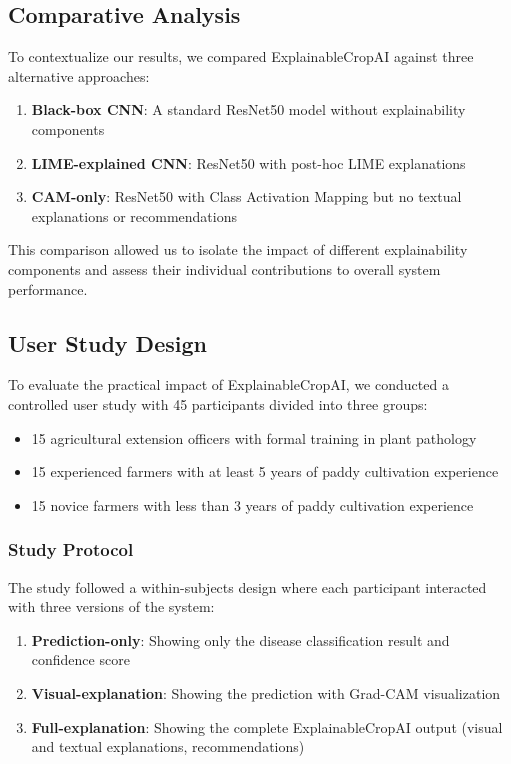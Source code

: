 \subsection{Comparative Analysis}

To contextualize our results, we compared ExplainableCropAI against three alternative approaches:

\begin{enumerate}
    \item \textbf{Black-box CNN}: A standard ResNet50 model without explainability components
    \item \textbf{LIME-explained CNN}: ResNet50 with post-hoc LIME explanations
    \item \textbf{CAM-only}: ResNet50 with Class Activation Mapping but no textual explanations or recommendations
\end{enumerate}

This comparison allowed us to isolate the impact of different explainability components and assess their individual contributions to overall system performance.

\subsection{User Study Design}

To evaluate the practical impact of ExplainableCropAI, we conducted a controlled user study with 45 participants divided into three groups:

\begin{itemize}
    \item 15 agricultural extension officers with formal training in plant pathology
    \item 15 experienced farmers with at least 5 years of paddy cultivation experience
    \item 15 novice farmers with less than 3 years of paddy cultivation experience
\end{itemize}

\subsubsection{Study Protocol}

The study followed a within-subjects design where each participant interacted with three versions of the system:

\begin{enumerate}
    \item \textbf{Prediction-only}: Showing only the disease classification result and confidence score
    \item \textbf{Visual-explanation}: Showing the prediction with Grad-CAM visualization
    \item \textbf{Full-explanation}: Showing the complete ExplainableCropAI output (visual and textual explanations, recommendations)
\end{enumerate}

